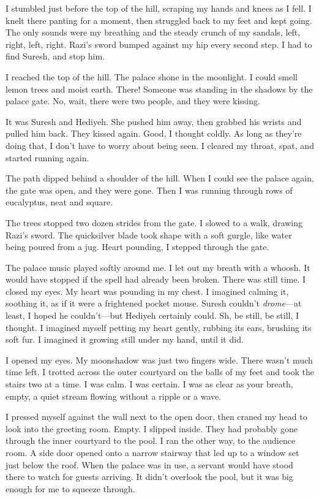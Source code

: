 I stumbled just before the top of the hill, scraping my hands and
knees as I fell.  I knelt there panting for a moment, then struggled
back to my feet and kept going.  The only sounds were my breathing and
the steady crunch of my sandals, left, right, left, right.  Razi's
sword bumped against my hip every second step.  I had to find Suresh,
and stop him.

I reached the top of the hill.  The palace shone in the moonlight.  I
could smell lemon trees and moist earth.  There! Someone was standing
in the shadows by the palace gate.  No, wait, there were two people,
and they were kissing.

It was Suresh and Hediyeh.  She pushed him away, then grabbed his
wrists and pulled him back.  They kissed again.  Good, I thought
coldly.  As long as they're doing that, I don't have to worry about
being seen.  I cleared my throat, spat, and started running again.

The path dipped behind a shoulder of the hill.  When I could see the
palace again, the gate was open, and they were gone.  Then I was
running through rows of eucalyptus, neat and square.

The trees stopped two dozen strides from the gate.  I slowed to a
walk, drawing Razi's sword.  The quicksilver blade took shape with a
soft gurgle, like water being poured from a jug.  Heart pounding, I
stepped through the gate.

The palace music played softly around me.  I let out my breath with a
whoosh.  It would have stopped if the spell had already been broken.
There was still time.  I closed my eyes.  My heart was pounding in my
chest.  I imagined calming it, soothing it, as if it were a frightened
pocket mouse.  Suresh couldn't \emph{drome}---at least, I hoped he
couldn't---but Hediyeh certainly could.  Sh, be still, be still, I
thought.  I imagined myself petting my heart gently, rubbing its ears,
brushing its soft fur.  I imagined it growing still under my hand,
until it did.

I opened my eyes.  My moonshadow was just two fingers wide.  There
wasn't much time left.  I trotted across the outer courtyard on the
balls of my feet and took the stairs two at a time.  I was calm.  I
was certain.  I was as clear as your breath, empty, a quiet stream
flowing without a ripple or a wave.

I pressed myself against the wall next to the open door, then craned
my head to look into the greeting room.  Empty.  I slipped inside.
They had probably gone through the inner courtyard to the pool.  I ran
the other way, to the audience room.  A side door opened onto a narrow
stairway that led up to a window set just below the roof.  When the
palace was in use, a servant would have stood there to watch for
guests arriving.  It didn't overlook the pool, but it was big enough
for me to squeeze through.

